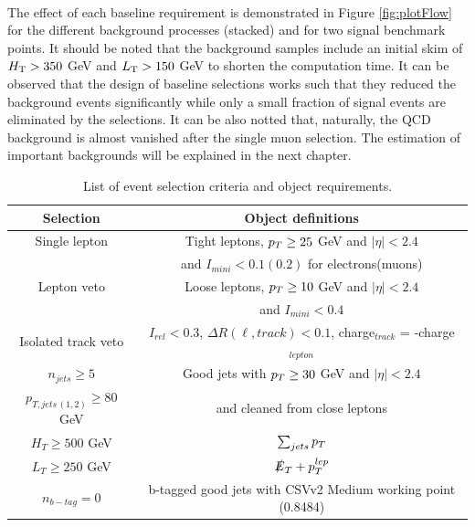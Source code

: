 \\
The effect of each baseline requirement is demonstrated in Figure \ref{fig:plotFlow} for the different background processes (stacked) and for two signal benchmark points. It should be noted that the background samples include an initial skim of $H_{\rm T} > 350$ GeV and $L_{\rm T} > 150$ GeV to shorten the computation time. It can be observed that the design of baseline selections works such that they reduced the background events significantly while only a small fraction of signal events are eliminated by the selections. It can be also notted that, naturally, the QCD background is almost vanished after the single muon selection. The estimation of important backgrounds will be explained in the next chapter.
\renewcommand{\arraystretch}{1.5}
\begin{table}[ht]
\begin{center}
\begin{tabular}{|c|c|}\hline
Selection        & Object definitions \\
\hline
\hline
Single lepton &Tight leptons, $p_T \geq 25$ GeV and $|\eta| < 2.4$\\
                      & and $I_{mini}<0.1(0.2)$ for electrons(muons)\\\hline
Lepton veto & Loose leptons, $p_T \geq 10$ GeV and $|\eta| < 2.4$ \\
		& and $I_{mini}<0.4$ \\\hline
Isolated track veto & $I_{rel}<0.3$, $\Delta R(\ell,track) <0.1$, charge$_{track}$ = -charge$_{lepton}$  \\\hline
$n_{jets} \geq 5$ & Good jets with $p_T \geq 30$ GeV and $|\eta| < 2.4$ \\
\cline{1-1}
$p_{T,jets\,(1,2)} \geq 80$ GeV & and cleaned from close leptons \\\hline
$H_T \geq 500$ GeV & $\sum_{jets} p_T$\\\hline
$L_T \geq 250$ GeV &  $\slashed{E}_T + p_T^{lep}$ \\\hline
$n_{b-tag} = 0$ & b-tagged good jets with CSVv2 Medium working point (0.8484)\\\hline
\end{tabular}
\end{center}
\caption{List of event selection criteria and object requirements.}\label{tab:CutSummary}
\end{table}
\renewcommand{\arraystretch}{1}
